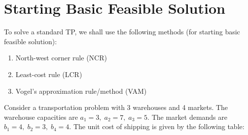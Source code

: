 \documentclass[../main-sheet.tex]{subfiles}
\begin{document}
\section{Starting Basic Feasible Solution}
To solve a standard TP, we shall use the following methods (for starting basic feasible solution):
\begin{enumerate}
    \item North-west corner rule (NCR)
    \item Least-cost rule (LCR)
    \item Vogel's approximation rule/method (VAM)
\end{enumerate}
\begin{prob}
    Consider a transportation problem with 3 warehouses and 4 markets. The warehouse capacities are \(a_1=3,\;a_2=7,\;a_3=5\). The market demands are \(b_1=4,\;b_2=3,\;b_4=4\). The unit cost of shipping is given by the following table:
    \begin{figure}[H]
        \centering
    \end{figure}
\end{prob}
\end{document}
